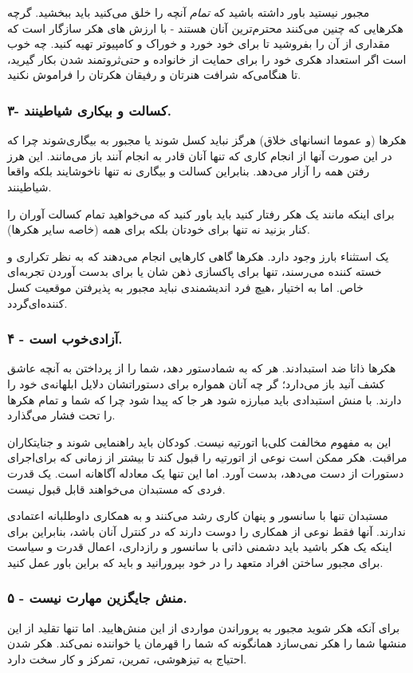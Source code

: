 مجبور نیستید باور داشته باشید که
\emph{تمام}
آنچه را خلق می‌کنید باید ببخشید. گرچه هکرهایی که چنین می‌کنند محترم‌ترین آنان هستند - با ارزش های ‌هکر سازگار است که مقداری ‌از آن را بفروشید تا برای خود خورد و خوراک و کامپیوتر تهیه کنید. چه خوب است اگر استعداد هکری خود را برای حمایت از خانواده و حتی‌ثروتمند شدن بکار گیرید، تا هنگامی‌که شرافت هنرتان و رفیقان هکرتان را فراموش نکنید.
\subsubsection*{۳- کسالت و بیکاری ‌شیاطینند.}
هکرها (و عموما انسانهای خلاق) هرگز نباید کسل شوند یا مجبور به بیگاری‌شوند چرا که در این صورت آنها از انجام کاری که تنها آنان قادر به انجام آنند باز می‌مانند. این هرز رفتن همه را آزار می‌دهد. بنابراین کسالت و بیگاری نه تنها ناخوشایند بلکه واقعا شیاطینند.

برای اینکه مانند یک هکر رفتار کنید باید باور کنید که می‌خواهید تمام کسالت آوران را کنار بزنید نه تنها برای خودتان بلکه برای همه (خاصه سایر هکرها).

یک استثناء بارز وجود دارد. هکرها گاهی کارهایی انجام می‌دهند که به نظر تکراری و خسته کننده می‌رسند، تنها برای پاکسازی ذهن شان یا برای بدست آوردن تجربه‌ای خاص. اما به اختیار ،هیچ فرد اندیشمندی نباید مجبور به پذیرفتن موقعیت کسل کننده‌ای‌گردد.
\subsubsection*{۴ - آزادی‌خوب است.}
هکرها ذاتا ضد استبدادند. هر که به شمادستور دهد، شما را از پرداختن به آنچه عاشق کشف آنید باز می‌دارد؛ گر چه آنان همواره برای دستوراتشان دلایل ابلهانه‌ی خود را دارند. با منش استبدادی باید مبارزه شود هر جا که پیدا شود چرا که شما و تمام هکرها را تحت فشار می‌گذارد.

این به مفهوم مخالفت کلی‌با اتورتیه نیست. کودکان باید راهنمایی شوند و جنایتکاران مراقبت. هکر ممکن است نوعی از اتورتیه را قبول کند تا بیشتر از زمانی که برای‌اجرای دستورات از دست می‌دهد، بدست آورد. اما این تنها یک معادله آگاهانه است. یک قدرت فردی که مستبدان می‌خواهند قابل قبول نیست.

مستبدان تنها با سانسور و پنهان کاری رشد می‌کنند و به همکاری داوطلبانه اعتمادی ندارند. آنها فقط نوعی از همکاری را دوست دارند که در کنترل آنان باشد، بنابراین برای اینکه یک هکر باشید باید دشمنی ذاتی با سانسور و رازداری‌، اعمال قدرت و سیاست برای مجبور ساختن افراد متعهد را در خود بپرورانید و باید که براین باور عمل کنید.
\subsubsection*{۵ - منش جایگزین مهارت نیست.}
برای آنکه هکر شوید مجبور به پروراندن مواردی از این منش‌هایید. اما تنها تقلید از این منشها شما را هکر نمی‌سازد همانگونه که شما را قهرمان یا خواننده نمی‌کند. هکر شدن احتیاج به تیزهوشی‌، تمرین، تمرکز و کار سخت دارد.

